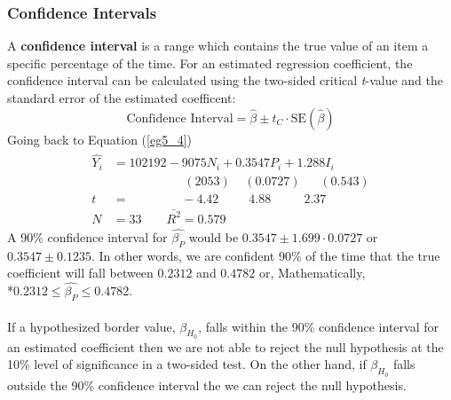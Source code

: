 \documentclass[11pt]{article}
\begin{document}
\subsubsection{Confidence Intervals}
A \textbf{confidence interval} is a range which contains the true value of an item a specific percentage of the time. For an estimated regression coefficient, the confidence interval can be calculated using the two-sided critical \textit{t}-value and the standard error of the estimated coefficent:
\begin{equation}
\text{Confidence Interval} = \hat{\beta} \pm t_C \cdot \text{SE}(\hat{\beta})
\end{equation}
Going back to Equation (\ref{eg5_4})
\begin{align*}
\label{eg5_4}
\begin{split}
\hat{Y_i} &= 102192 - {9075N_i} + {0.3547P_i} + {1.288 I_i}\\
&\>\>\>\>\>\>\>\>\>\>\>\>\>\>\>\>\>\>\>\>\>\>\>\>\>\> (2053) \>\>\>\>\> (0.0727)\>\>\>\>\>\>\>(0.543)\\
t&=\>\>\>\>\>\>\>\>\>\>\>\>\>\>\>\>\>\>\> -4.42 \>\>\>\>\>\>\>\>\>\>\> 4.88\>\>\>\>\>\>\>\>\>\>\>\>2.37\\
N&=33\quad\quad\bar{R^2}=0.579
\end{split}
\end{align*}
A 90\% confidence interval for $\hat{\beta_P}$ would be $0.3547 \pm 1.699\cdot0.0727$ or $0.3547 \pm 0.1235$. In other words, we are confident 90\% of the time that the true coefficient will fall between $0.2312$ and $0.4782$ or, Mathematically, \\*$0.2312 \leq \hat{\beta_P} \leq 0.4782$.\\ \\
If a hypothesized border value, $\beta_{H_0}$, falls within the 90\% confidence interval for an estimated coefficient then we are not able to reject the null hypothesis at the 10\% level of significance in a two-sided test. On the other hand, if $\beta_{H_0}$ falls outside the 90\% confidence interval the we can reject the null hypothesis.
\end{document}
